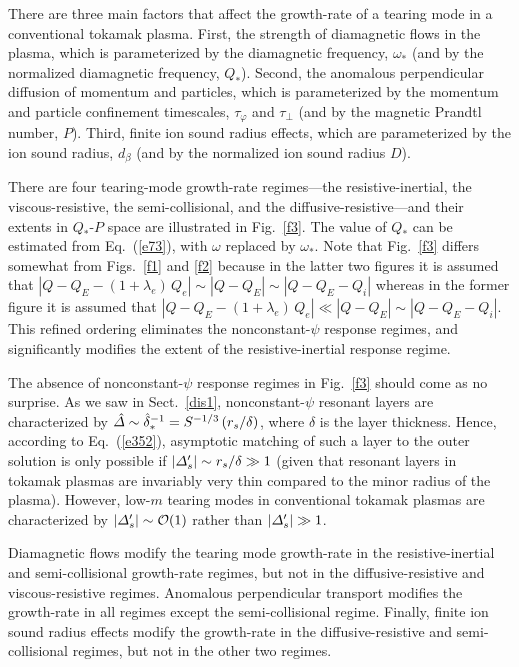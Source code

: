\documentclass[12pt,prb,aps]{revtex4-1}
\begin{document}
There are three main factors that
affect the growth-rate of a tearing mode in a conventional tokamak plasma. First, the strength of diamagnetic flows in the plasma, which is parameterized by the
diamagnetic frequency, $\omega_\ast$ (and by the normalized diamagnetic frequency, $Q_\ast$). Second, the  anomalous perpendicular diffusion of momentum and particles, which is parameterized by the momentum and particle confinement
timescales, $\tau_\varphi$ and $\tau_\perp$ (and by the magnetic Prandtl number, $P$). Third, finite ion sound radius effects,  which are parameterized by the ion sound radius, $d_\beta$ (and by the normalized ion 
sound radius $D$).

 There are four tearing-mode growth-rate regimes---the resistive-inertial, the viscous-resistive, the semi-collisional, and the diffusive-resistive---and their extents in $Q_\ast$-$P$ space are illustrated in Fig.~\ref{f3}. The value of $Q_\ast$
 can be estimated from Eq.~(\ref{e73}), with $\omega$ replaced by $\omega_\ast$. 
Note that Fig.~\ref{f3} differs somewhat from Figs.~\ref{f1} and \ref{f2} because in the latter two
figures it is assumed that $|Q-Q_E-(1+\lambda_e)\,Q_e|\sim |Q-Q_E|\sim |Q-Q_E-Q_i|$ whereas
in the former figure it is assumed that $|Q-Q_E-(1+\lambda_e)\,Q_e|\ll |Q-Q_E|\sim |Q-Q_E-Q_i|$.
This refined ordering eliminates the nonconstant-$\psi$ response regimes, and significantly modifies the
extent of the resistive-inertial response regime. 

The absence of nonconstant-$\psi$ response regimes in Fig.~\ref{f3}
should come as no surprise. As we saw in Sect.~\ref{dis1}, nonconstant-$\psi$ resonant layers
are characterized by $\hat{\mit\Delta}\sim\hat{\delta}_\ast^{-1}= S^{-1/3}\,(r_s/\delta)$, where $\delta$
is the layer thickness. Hence, according to Eq.~(\ref{e352}), asymptotic matching of such a
layer to the outer solution is only possible if $|{\mit\Delta}_s'|\sim r_s/\delta \gg 1$ (given that resonant
layers in tokamak plasmas are invariably very thin compared to the minor radius of the plasma). However,
low-$m$ tearing modes in conventional tokamak plasmas are characterized by $|{\mit\Delta}_s'|\sim {\cal O}(1)$ rather than
$|{\mit\Delta}_s'|\gg 1$. 

Diamagnetic flows modify the tearing mode growth-rate in the resistive-inertial and semi-collisional
growth-rate regimes, but not in the diffusive-resistive and viscous-resistive regimes. Anomalous perpendicular
transport modifies the growth-rate in all regimes except the semi-collisional regime. Finally, finite ion sound radius 
effects modify the growth-rate in the diffusive-resistive and semi-collisional regimes, but not in the other two
regimes. 
\end{document}
